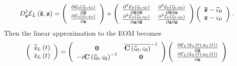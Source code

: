 \documentclass[aps,preprint]{revtex4}%
\begin{document}
\begin{equation}
D_{\mathbf{z}}^{1}\mathcal{E}_{L}\left(  \mathbf{\bar{z}},\mathbf{z}\right)
=\left(
\begin{array}
[c]{c}%
\frac{\partial\mathcal{E}_{0}\left(  \mathbf{\bar{\varsigma}}_{0}%
,\mathbf{\varsigma}_{0}\right)  }{\partial\mathbf{\bar{z}}}\\
\frac{\partial\mathcal{E}_{0}\left(  \mathbf{\bar{\varsigma}}_{0}%
,\mathbf{\varsigma}_{0}\right)  }{\partial\mathbf{z}}%
\end{array}
\right)  +\left(
\begin{array}
[c]{cc}%
\frac{\partial^{2}\mathcal{E}_{0}\left(  \mathbf{\bar{\varsigma}}%
_{0},\mathbf{\varsigma}_{0}\right)  }{\partial\mathbf{\bar{z}}\partial
\mathbf{\bar{z}}} & \frac{\partial^{2}\mathcal{E}_{0}\left(  \mathbf{\bar
{\varsigma}}_{0},\mathbf{\varsigma}_{0}\right)  }{\partial\mathbf{\bar{z}%
}\partial\mathbf{z}}\\
\frac{\partial^{2}\mathcal{E}_{0}\left(  \mathbf{\bar{\varsigma}}%
_{0},\mathbf{\varsigma}_{0}\right)  }{\partial\mathbf{z}\partial
\mathbf{\bar{z}}} & \frac{\partial^{2}\mathcal{E}_{0}\left(  \mathbf{\bar
{\varsigma}}_{0},\mathbf{\varsigma}_{0}\right)  }{\partial\mathbf{z}%
\partial\mathbf{z}}%
\end{array}
\right)  \left(
\begin{array}
[c]{c}%
\mathbf{\bar{z}-\bar{\varsigma}}_{0}\\
\mathbf{z-\varsigma}_{0}%
\end{array}
\right)  .
\end{equation}
Then the linear approximation to the EOM becomes
\begin{equation}
\left(
\begin{array}
[c]{c}%
\overline{\mathrm{\dot{z}}}_{L}\left(  t\right) \\
\mathrm{\dot{z}}_{L}\left(  t\right)
\end{array}
\right)  =\left(
\begin{array}
[c]{cc}%
\mathbf{0} & \overline{\mathbf{C}\left(  \mathbf{\bar{\varsigma}}%
_{0},\mathbf{\varsigma}_{0}\right)  }^{-1}\\
-i\mathbf{C}\left(  \mathbf{\bar{\varsigma}}_{0},\mathbf{\varsigma}%
_{0}\right)  ^{-1} & \mathbf{0}%
\end{array}
\right)  \left(
\begin{array}
[c]{c}%
\frac{\partial\mathcal{E}_{L}\left(  \mathrm{\bar{z}}_{L}\left(  t\right)
,\mathrm{z}_{L}\left(  t\right)  \right)  }{\partial\mathbf{\bar{z}}}\\
\frac{\partial\mathcal{E}_{L}\left(  \mathrm{\bar{z}}_{L}\left(  t\right)
,\mathrm{z}_{L}\left(  t\right)  \right)  }{\partial\mathbf{z}}%
\end{array}
\right)
\end{equation}
\end{document}

